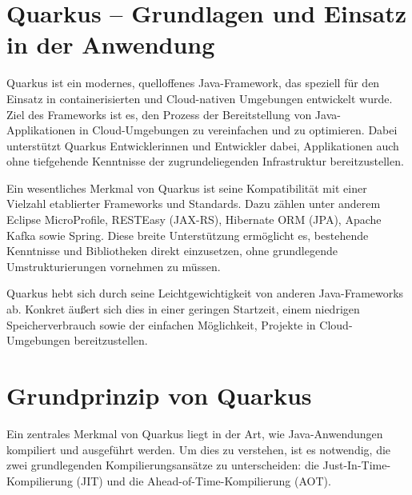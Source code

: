 


\section{Quarkus – Grundlagen und Einsatz in der Anwendung}

Quarkus ist ein modernes, quelloffenes Java-Framework, das speziell für den Einsatz 
in containerisierten und Cloud-nativen Umgebungen entwickelt wurde. Ziel des Frameworks 
ist es, den Prozess der Bereitstellung von Java-Applikationen in Cloud-Umgebungen zu 
vereinfachen und zu optimieren. Dabei unterstützt Quarkus Entwicklerinnen und Entwickler 
dabei, Applikationen auch ohne tiefgehende Kenntnisse der zugrundeliegenden Infrastruktur 
bereitzustellen.

Ein wesentliches Merkmal von Quarkus ist seine Kompatibilität mit einer Vielzahl 
etablierter Frameworks und Standards. Dazu zählen unter anderem Eclipse MicroProfile, 
RESTEasy (JAX-RS), Hibernate ORM (JPA), Apache Kafka sowie Spring. Diese breite 
Unterstützung ermöglicht es, bestehende Kenntnisse und Bibliotheken direkt einzusetzen, 
ohne grundlegende Umstrukturierungen vornehmen zu müssen.

Quarkus hebt sich durch seine Leichtgewichtigkeit von anderen Java-Frameworks ab. 
Konkret äußert sich dies in einer geringen Startzeit, einem niedrigen Speicherverbrauch 
sowie der einfachen Möglichkeit, Projekte in Cloud-Umgebungen bereitzustellen.


\section{Grundprinzip von Quarkus}

Ein zentrales Merkmal von Quarkus liegt in der Art, wie Java-Anwendungen kompiliert 
und ausgeführt werden. Um dies zu verstehen, ist es notwendig, die zwei grundlegenden 
Kompilierungsansätze zu unterscheiden: die Just-In-Time-Kompilierung (JIT) und die 
Ahead-of-Time-Kompilierung (AOT).

